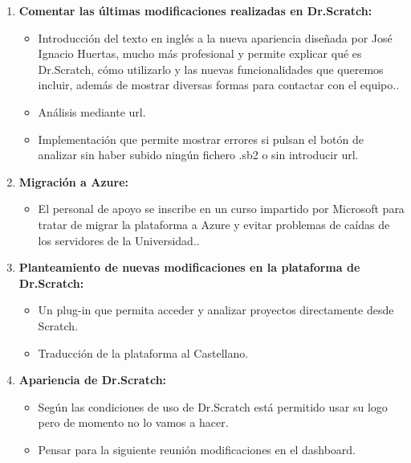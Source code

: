 \documentclass[a4paper,12pt]{letter}
\begin{document}
\begin{letter}
\begin{enumerate}
    
    \item {\textbf {Comentar las últimas modificaciones realizadas en Dr.Scratch:}}
    \begin{itemize}
        \item {Introducción del texto en inglés a la nueva apariencia diseñada por José Ignacio Huertas, mucho más profesional y permite explicar qué es Dr.Scratch, cómo utilizarlo y las nuevas funcionalidades que queremos incluir, además de mostrar diversas formas para contactar con el equipo..}
        \item {Análisis mediante url.}
        \item {Implementación que permite mostrar errores si pulsan el botón de analizar sin haber subido ningún fichero .sb2 o sin introducir url.}
    \end{itemize}

    \item{\textbf {Migración a Azure:}}
    \begin{itemize}
        \item {El personal de apoyo se inscribe en un curso impartido por Microsoft para tratar de migrar la plataforma a Azure y evitar problemas de caídas de los servidores de la Universidad..}

    \end{itemize}

	\item{\textbf {Planteamiento de nuevas modificaciones en la plataforma de 
                    Dr.Scratch:}}
    \begin{itemize}
        \item {Un plug-in que permita acceder y analizar proyectos directamente desde Scratch.}
        \item {Traducción de la plataforma al Castellano.}
    \end{itemize}

    \item {\textbf {Apariencia de Dr.Scratch:}}
        \begin{itemize}
            \item {Según las condiciones de uso de Dr.Scratch está permitido usar su logo pero de momento no lo vamos a hacer.}
            \item {Pensar para la siguiente reunión modificaciones en el dashboard.}
        \end{itemize}


\end{enumerate}
\end{letter}
\end{document}
